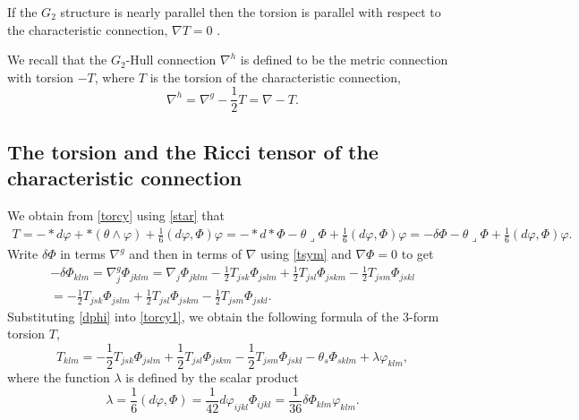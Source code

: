 \documentclass[10pt,british]{article}
\def\sb {{\nabla}}
\def\LC{{\nabla^g}}
\def\p{{\varphi}}
\def\ph{{\Phi}}
\begin{document}
If the $G_2$ structure is nearly parallel then  the torsion is parallel with respect to the characteristic connection, $\sb T=0$  \cite{FI}.

We recall that the $G_2$-Hull connection $\sb^h$ is defined to be the metric connection with torsion $-T$, where $T$ is the torsion of the characteristic connection,
\begin{equation}\label{hu}\sb^h=\LC-\frac12T=\sb-T.
\end{equation}





\subsection{The torsion and the Ricci tensor of the characteristic connection}
We obtain from \eqref{torcy} using \eqref{star} that
\begin{equation}\label{torcy1}
\begin{split}
T=-*d\p +*(\theta\wedge\p)+\frac{1}{6}(d\p,\ph)\p 
=-*d*\Phi-\theta\lrcorner\Phi+\frac{1}{6}(d\p,\ph)\p
=-\delta\Phi-\theta\lrcorner\Phi+\frac{1}{6}(d\p,\ph)\p.
\end{split}
\end{equation}
Write $\delta\ph$  in terms $\LC$  and then in terms of $\sb$ using \eqref{tsym} and  $\sb\Phi=0$ to get 
\begin{equation}\label{dphi}
\begin{split}
-\delta\Phi_{klm}=\sb^g_j\Phi_{jklm}=\sb_j\Phi_{jklm}-\frac12T_{jsk}\Phi_{jslm}+\frac12T_{jsl}\Phi_{jskm}-\frac12T_{jsm}\Phi_{jskl}\\
=-\frac12T_{jsk}\Phi_{jslm}+\frac12T_{jsl}\Phi_{jskm}-\frac12T_{jsm}\Phi_{jskl}.
\end{split}
\end{equation}
Substituting \eqref{dphi} into \eqref{torcy1}, we obtain  the following formula of the 3-form torsion $T$,
\begin{equation}\label{torcy2}
T_{klm}=-\frac12T_{jsk}\Phi_{jslm}+\frac12T_{jsl}\Phi_{jskm}-\frac12T_{jsm}\Phi_{jskl}-\theta_s\Phi_{sklm}+\lambda\p_{klm}, 
\end{equation}
where the function $\lambda$ is defined by the  scalar product
\begin{equation}\label{lm}
\lambda =\frac16(d\p,\ph)=\frac1{42}d\p_{ijkl}\ph_{ijkl}=\frac1{36}\delta\ph_{klm}\p_{klm}.
\end{equation}
\end{document}
